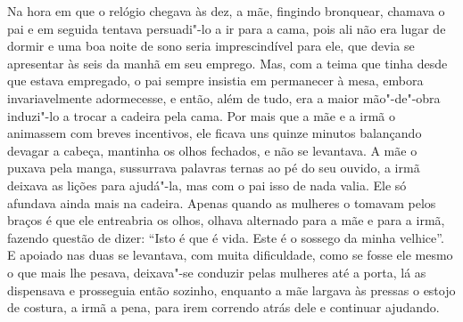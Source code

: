 Na hora em que o relógio chegava às dez, a mãe, fingindo bronquear,
chamava o pai e em seguida tentava persuadi"-lo a ir para a cama, pois ali não
era lugar de dormir e uma boa noite de sono seria imprescindível para ele,
que devia se apresentar às seis da manhã em seu emprego. Mas, com a teima
que tinha desde que estava empregado, o pai sempre insistia em permanecer
à mesa, embora invariavelmente adormecesse, e então, além de tudo, era a
maior mão"-de"-obra induzi"-lo a trocar a cadeira pela cama. Por mais que a
mãe e a irmã o animassem com breves incentivos, ele ficava uns quinze
minutos balançando devagar a cabeça, mantinha os olhos fechados, e não se
levantava. A mãe o puxava pela manga, sussurrava palavras ternas ao pé do
seu ouvido, a irmã deixava as lições para ajudá"-la, mas com o pai isso de
nada valia. Ele só afundava ainda mais na cadeira. Apenas quando as
mulheres o tomavam pelos braços é que ele entreabria os olhos, olhava
alternado para a mãe e para a irmã, fazendo questão de dizer: “Isto é que
é vida. Este é o sossego da minha velhice”. E apoiado nas duas se
levantava, com muita dificuldade, como se fosse ele mesmo o que mais lhe
pesava, deixava"-se conduzir pelas mulheres até a porta, lá as dispensava e
prosseguia então sozinho, enquanto a mãe largava às pressas o estojo de
costura, a irmã a pena, para irem correndo atrás dele e continuar ajudando.

